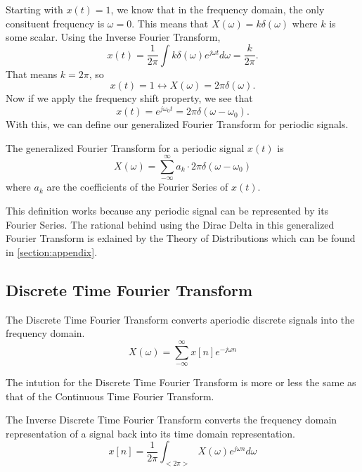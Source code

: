 Starting with $x(t)=1$, we know that in the frequency domain, the only consituent frequency is $\omega=0$.
This means that $X(\omega) = k\delta(\omega)$ where $k$ is some scalar.
Using the Inverse Fourier Transform,
\[
  x(t) = \frac{1}{2\pi}\int{k\delta(\omega)e^{j\omega t}d\omega} = \frac{k}{2\pi}.
\]
That means $k = 2\pi$, so
\[
  x(t) = 1 \leftrightarrow X(\omega) = 2\pi \delta(\omega).
\]
Now if we apply the frequency shift property, we see that
\[
  x(t) = e^{j\omega_0 t} = 2\pi \delta(\omega - \omega_0).
\]
With this, we can define our generalized Fourier Transform for periodic signals.
\begin{definition}
    The generalized Fourier Transform for a periodic signal $x(t)$ is
    \[
X(\omega) = \sum_{-\infty}^{\infty}{a_k\cdot 2\pi \delta(\omega - \omega_0)}
\]
where $a_k$ are the coefficients of the Fourier Series of $x(t)$.
\end{definition}
This definition works because any periodic signal can be represented by its Fourier Series.
The rational behind using the Dirac Delta in this generalized Fourier Transform is exlained by the 
Theory of Distributions which can be found in \cref{section:appendix}.
\subsection{Discrete Time Fourier Transform}
\begin{definition}
    The Discrete Time Fourier Transform converts aperiodic discrete signals into the frequency domain.
    \[
X(\omega) = \sum_{-\infty}^{\infty}{x[n]e^{-j\omega n}}
\]
\end{definition}
The intution for the Discrete Time Fourier Transform is more or less the same as that of the Continuous Time Fourier Transform.
\begin{definition}
    The Inverse Discrete Time Fourier Transform converts the frequency domain representation of a signal
    back into its time domain representation.
    \[
x[n] = \frac{1}{2\pi}\int_{<2\pi>}{X(\omega)e^{j\omega n}d\omega}
\]
\end{definition}
